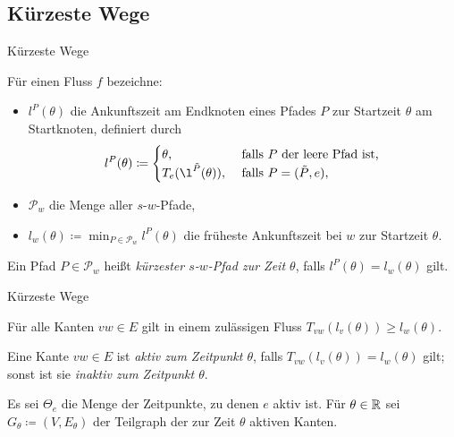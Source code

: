 \subsection{Kürzeste Wege}

\begin{frame}{Kürzeste Wege}
	\begin{definition}
		Für einen Fluss $f$ bezeichne:
		\begin{itemize}[label=\color{darkblue}$\bullet$]
			\item\pause $l^P(\theta)$ die Ankunftszeit am Endknoten eines Pfades $P$ zur Startzeit $\theta$ am Startknoten, definiert durch \[
				l^P(\theta) \coloneq \begin{cases}
					\theta, &\text{ falls $P$ der leere Pfad ist,}\\
					T_e( \l^{\tilde{P}}(\theta)), &\text{ falls $P=(\tilde{P}, e)$,}
				\end{cases}
			\]
			\item\pause $\mathcal{P}_w$ die Menge aller $s$-$w$-Pfade,
			\item\pause $l_w(\theta) \coloneq \min_{P\in\mathcal{P}_w} l^P(\theta)$ die früheste Ankunftszeit bei $w$ zur Startzeit $\theta$.
		\end{itemize}
	\pause Ein Pfad $P\in \mathcal{P}_w$ heißt \emph{kürzester $s$-$w$-Pfad zur Zeit $\theta$}, falls $l^P(\theta)=l_w(\theta)$ gilt.
	\end{definition}
\end{frame}

\begin{frame}{Kürzeste Wege}
	\begin{lemma}[Dreiecksungleichung]
		Für alle Kanten $vw\in E$ gilt in einem zulässigen Fluss $T_{vw}(l_v(\theta))\geq l_w(\theta)$.
	\end{lemma}
	
	\pause\begin{definition}
		Eine Kante $vw\in E$ ist \emph{aktiv zum Zeitpunkt $\theta$}, falls $T_{vw}(l_v(\theta)) = l_w(\theta)$ gilt; sonst ist sie \emph{inaktiv zum Zeitpunkt $\theta$}.
		
		\pause
		Es sei $\Theta_e$ die Menge der Zeitpunkte, zu denen $e$ aktiv ist.
		Für $\theta\in\mathbb{R}$ sei $G_\theta\coloneq (V, E_\theta)$ der Teilgraph der zur Zeit $\theta$ aktiven Kanten.
	\end{definition}
\end{frame}